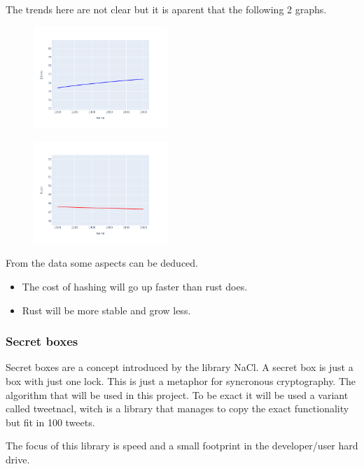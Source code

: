 \documentclass[12pt, letterpaper]{article}
\begin{document}
\begin{multicols}{2}
    The trends here are not clear but it is aparent that the following 2 graphs.

    \begin{figure}[H]
        \centering
        \includegraphics[width=0.45\textwidth]{trend_hash_deno}
    \end{figure}

    \begin{figure}[H]
        \centering
        \includegraphics[width=0.45\textwidth]{images/trend_hash_rust.png}
    \end{figure}

    From the data some aspects can be deduced.
    \begin{itemize}
        \item The cost of hashing will go up faster than rust does.
        \item Rust will be more stable and grow less.
    \end{itemize}

    \subsubsection{Secret boxes}

    Secret boxes are a concept introduced by the library NaCl. A secret box is just a box with just one lock. This is just a metaphor for syncronous cryptography. The algorithm that will be used in this project. To be exact it will be used a variant called tweetnacl, witch is a library that manages to copy the exact functionality but fit in 100 tweets.

    The focus of this library is speed and a small footprint in the developer/user hard drive.


\end{multicols}
\end{document}

